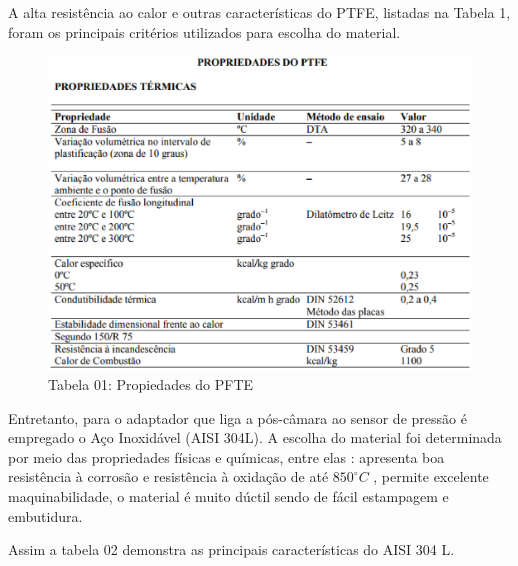 A alta resistência ao calor e outras características do PTFE, listadas na Tabela 1, foram os principais critérios utilizados para escolha do material.\\

\begin{figure}[!htb]                                                               
   \centering                                                                      
   \includegraphics[keepaspectratio=true]{figuras/Teflon.eps}
   \caption{Tabela 01: Propiedades do PFTE}                        
\end{figure}

Entretanto, para o adaptador que liga a pós-câmara ao sensor de pressão é empregado o Aço Inoxidável (AISI 304L). A escolha do material foi determinada por meio das propriedades físicas e químicas, entre elas : apresenta boa resistência à corrosão e resistência à oxidação de até $850^{\circ}C$ , permite excelente maquinabilidade, o material é muito dúctil sendo de fácil estampagem e  embutidura.

Assim a tabela 02 demonstra as principais características do AISI 304 L.

